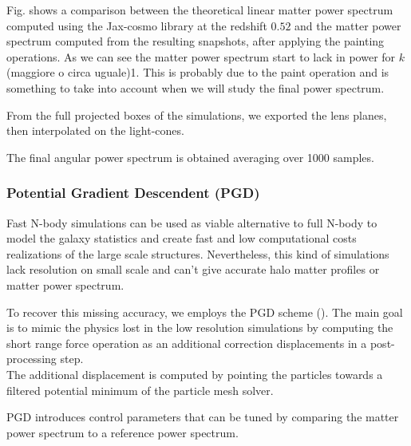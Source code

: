 \documentclass[twocolumn,twocolappendix]{aastex63}
\begin{document}
Fig. shows a comparison between the theoretical linear matter power spectrum computed using the Jax-cosmo library at the redshift $0.52$ and the matter power spectrum computed from the resulting snapshots, after applying the painting operations. As we can see the matter power spectrum start to lack in power for $k$(maggiore o circa uguale)1. This is probably due to the paint operation and is something to take into account when we will study the final power spectrum.



From the full projected boxes of the simulations, we exported the lens planes, then interpolated on the light-cones. 


The final angular power spectrum is obtained averaging over 1000 samples.


\subsubsection{Potential Gradient Descendent (PGD)}    
Fast N-body simulations can be used as viable alternative to full N-body to model the galaxy statistics and create fast and low computational costs realizations of the large scale structures. Nevertheless, this kind of simulations lack resolution on small scale and can't give accurate halo matter profiles or matter power spectrum. 


To recover this missing accuracy, we employs the PGD scheme (\cite{Dai_2018}). 
The main goal is to mimic the physics lost in the low resolution simulations by computing the short range force operation as an additional correction displacements in a post-processing step. \\
The additional displacement is computed by pointing the particles towards a filtered potential minimum of the particle mesh solver.


PGD introduces control parameters that can be tuned by comparing the matter power spectrum to a reference power spectrum. 
\end{document}
